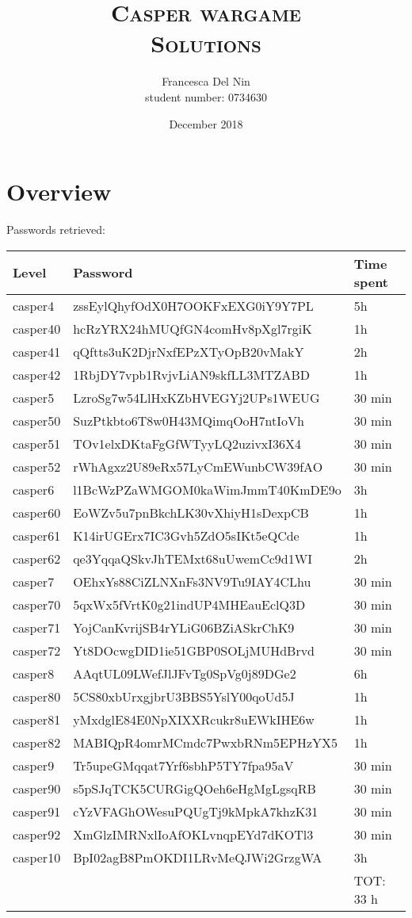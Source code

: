 \documentclass[a4paper,12pt]{article}
\title{\scshape Casper wargame \\ Solutions}
\author{Francesca Del Nin \\ student number: 0734630}
\date{December 2018}
\begin{document}
\maketitle

\tableofcontents

\newpage
\section{Overview}
Passwords retrieved:
\begin{table}[H]
\begin{tabular} {l|l|l}
 Level & Password & Time spent  \\
 \hline
 casper4 & zssEylQhyfOdX0H7OOKFxEXG0iY9Y7PL &  5h \\
 casper40 & hcRzYRX24hMUQfGN4comHv8pXgl7rgiK & 1h \\
 casper41 & qQftts3uK2DjrNxfEPzXTyOpB20vMakY & 2h \\
 casper42 & 1RbjDY7vpb1RvjvLiAN9skfLL3MTZABD & 1h \\
 \hline
 casper5 & LzroSg7w54LlHxKZbHVEGYj2UPs1WEUG & 30 min \\
 casper50 & SuzPtkbto6T8w0H43MQimqOoH7ntIoVh & 30 min\\
 casper51 & TOv1elxDKtaFgGfWTyyLQ2uzivxI36X4 & 30 min\\
 casper52 & rWhAgxz2U89eRx57LyCmEWunbCW39fAO & 30 min\\
 \hline
 casper6 & l1BcWzPZaWMGOM0kaWimJmmT40KmDE9o & 3h \\ 
 casper60 & EoWZv5u7pnBkchLK30vXhiyH1sDexpCB & 1h\\
 casper61 & K14irUGErx7IC3Gvh5ZdO5sIKt5eQCde & 1h \\ 
 casper62 & qe3YqqaQSkvJhTEMxt68uUwemCc9d1WI & 2h \\ 
 \hline
 casper7 & OEhxYs88CiZLNXnFs3NV9Tu9IAY4CLhu & 30 min\\ 
 casper70 & 5qxWx5fVrtK0g21indUP4MHEauEclQ3D & 30 min \\
 casper71 & YojCanKvrijSB4rYLiG06BZiASkrChK9 & 30 min\\              casper72 & Yt8DOcwgDID1ie51GBP0SOLjMUHdBrvd &  30 min\\
 \hline
 casper8 & AAqtUL09LWefJlJFvTg0SpVg0j89DGe2 & 6h \\ 
 casper80 & 5CS80xbUrxgjbrU3BBS5YslY00qoUd5J &  1h \\
 casper81 & yMxdglE84E0NpXIXXRcukr8uEWkIHE6w &  1h\\ 
 casper82 & MABIQpR4omrMCmdc7PwxbRNm5EPHzYX5 & 1h \\ 
 \hline
 casper9 & Tr5upeGMqqat7Yrf6sbhP5TY7fpa95aV & 30 min \\
 casper90 &  s5pSJqTCK5CURGigQOeh6eHgMgLgsqRB & 30 min \\
 casper91 &  cYzVFAGhOWesuPQUgTj9kMpkA7khzK31 & 30 min\\
 casper92 & XmGlzIMRNxlIoAfOKLvnqpEYd7dKOTl3 & 30 min\\
 \hline
	casper10 & BpI02agB8PmOKDI1LRvMeQJWi2GrzgWA & 3h \\
	\hline \hline
  	& & TOT: 33 h
\end{tabular}
\end{table}
\end{document}
